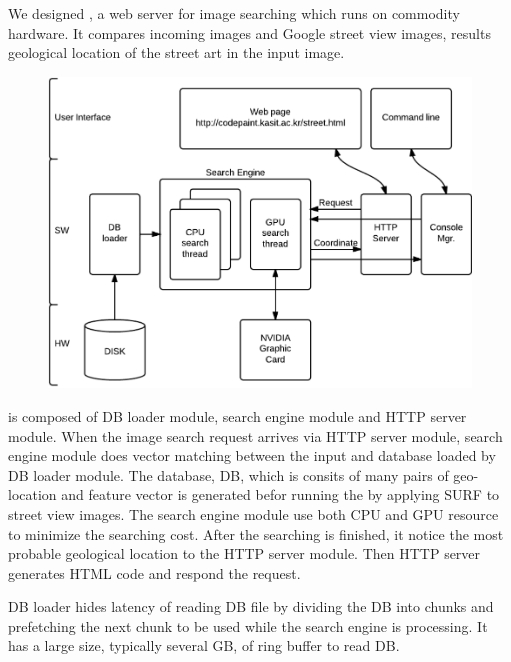 
We designed \name{}, a web server for image searching which runs on commodity hardware.
It compares incoming images and Google street view images, results geological location of the street art in the input image.


\begin{figure}[t]
	\centering
	\includegraphics[scale=0.50]{figs/arch}
	\vspace{-0.1in}
	\vspace{-0.1in}
	\label{fig:arch}
\end{figure}

\name{} is composed of DB loader module, search engine module and HTTP server module.
When the image search request arrives via HTTP server module, search engine module does vector matching between the input and database loaded by DB loader module.
The database, DB, which is consits of many pairs of geo-location and feature vector is generated befor running the \name{} by applying SURF to street view images.
The search engine module use both CPU and GPU resource to minimize the searching cost.
After the searching is finished, it notice the most probable geological location to the HTTP server module.
Then HTTP server generates HTML code and respond the request.

DB loader hides latency of reading DB file by dividing the DB into chunks and prefetching the next chunk to be used while the search engine is processing.
It has a large size, typically several GB, of ring buffer to read DB.


